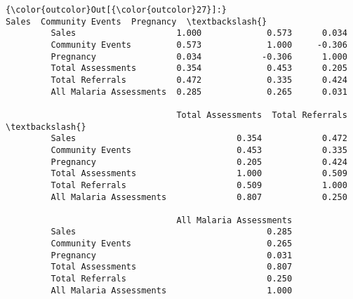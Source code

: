 \documentclass[11pt]{article}
\begin{document}
\begin{Verbatim}[commandchars=\\\{\}]
{\color{outcolor}Out[{\color{outcolor}27}]:}                          Sales  Community Events  Pregnancy  \textbackslash{}
         Sales                    1.000             0.573      0.034   
         Community Events         0.573             1.000     -0.306   
         Pregnancy                0.034            -0.306      1.000   
         Total Assessments        0.354             0.453      0.205   
         Total Referrals          0.472             0.335      0.424   
         All Malaria Assessments  0.285             0.265      0.031   
         
                                  Total Assessments  Total Referrals  \textbackslash{}
         Sales                                0.354            0.472   
         Community Events                     0.453            0.335   
         Pregnancy                            0.205            0.424   
         Total Assessments                    1.000            0.509   
         Total Referrals                      0.509            1.000   
         All Malaria Assessments              0.807            0.250   
         
                                  All Malaria Assessments  
         Sales                                      0.285  
         Community Events                           0.265  
         Pregnancy                                  0.031  
         Total Assessments                          0.807  
         Total Referrals                            0.250  
         All Malaria Assessments                    1.000  
\end{Verbatim}
            
    \begin{center}
    \end{center}
    { \hspace*{\fill} \\}
    
    \begin{center}
    \end{center}
    { \hspace*{\fill} \\}
    
\end{document}
